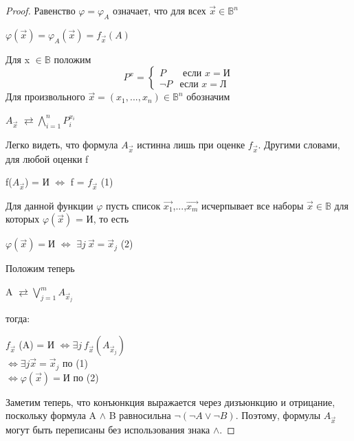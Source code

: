 \begin{proof}
	Равенство $\varphi = \varphi_A$ означает, что для всех $\vec{x} \in \mathbb{B}^n$
	\begin{center}
		$\varphi (\vec{x}) = \varphi_A (\vec{x}) = f_{\vec{x}} (A)$
	\end{center}
	Для x $\in \mathbb{B}$ положим
	\begin{equation*}
		P^x= 
		\begin{cases}
			P  &\text{ если $x = $И} \\
			\neg P &\text{если $x = $Л}
		\end{cases}
	\end{equation*}
	Для произвольного $\vec{x} = (x_1,...,x_n) \in \mathbb{B}^n$ обозначим
	\begin{center}
		$A_{\vec{x}}$   $\rightleftarrows  \bigwedge_{i=1}^n P_i^{x_i}$
	\end{center}
	Легко видеть, что формула $A_{\vec{x}}$ истинна лишь при оценке $f_{\vec{x}}$. Другими словами, для любой оценки f
	\begin{center}
		f($A_{\vec{x}}$) = И $\Longleftrightarrow$ f = $f_{\vec{x}}$ (1)
	\end{center}
	Для данной функции $\varphi$ пусть список $\vec{x_1}$,...,$\vec{x_m}$ исчерпывает все наборы $\vec{x} \in
	\mathbb{B}$ для которых $\varphi(\vec{x})$ = И, то есть 
	\begin{center}
		$\varphi(\vec{x}) = $И $\Longleftrightarrow$ $\exists j \ \vec{x} = \vec{x}_j$ (2)
	\end{center}
	Положим теперь
	\begin{center}
		A $\rightleftarrows \bigvee_{j=1}^m A_{\vec{x}_j}$
	\end{center}
	тогда: 
	\begin{center}
		$f_{\vec{x}}$ (A) = И $\Longleftrightarrow \exists j \ f_{\vec{x}} (A_{\vec{x}_j})$\\
		$\Longleftrightarrow \exists j \vec{x} = \vec{x}_j$ по (1)\\
		$\Longleftrightarrow \varphi (\vec{x}) =$И по (2)
	\end{center}
	Заметим теперь, что конъюнкция выражается через дизъюнкцию и
	отрицание, поскольку формула A $\land$ B равносильна $\neg(\neg A \lor \neg B)$.  Поэтому, формулы
	$A_{\vec{x}}$ могут быть переписаны без использования знака $\land$. 
\end{proof}
